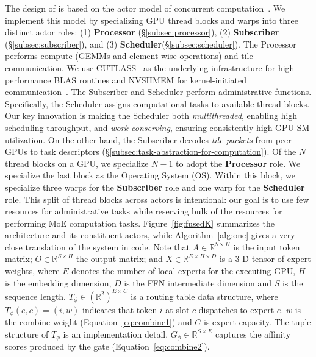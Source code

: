 The design of \sysname is based on the actor model of concurrent
computation~\cite{agha:85, 10.5555/1624775.1624804, Greif:75}.
We implement this model by specializing GPU thread blocks and warps into three distinct actor roles:
(1) \textbf{Processor} (\S\ref{subsec:processor}), (2) \textbf{Subscriber} (\S\ref{subsec:subscriber}),
and (3) \textbf{Scheduler}(\S\ref{subsec:scheduler}).
The Processor performs compute (GEMMs and element-wise operations) and tile communication.
We use CUTLASS~\cite{Thakkar_CUTLASS_2023} as the underlying infrastructure for high-performance
BLAS routines and NVSHMEM for kernel-initiated communication~\cite{nvshm}.
The Subscriber and Scheduler perform administrative functions.
Specifically, the Scheduler assigns computational tasks to available thread blocks.
Our key innovation is making the Scheduler both \emph{multithreaded},
enabling high scheduling throughput, and \emph{work-conserving}, ensuring consistently high GPU SM utilization.
On the other hand, the Subscriber decodes \emph{tile packets} from peer GPUs to task descriptors
(\S\ref{subsec:task-abstraction-for-computation}).
Of the $N$ thread blocks on a GPU, we specialize $N-1$ to adopt the \textbf{Processor} role.
We specialize the last block as the Operating System (OS).
Within this block, we specialize three warps for the \textbf{Subscriber} role and
one warp for the \textbf{Scheduler} role.
This split of thread blocks across actors is intentional: our goal is to use few resources for administrative
tasks while reserving bulk of the resources for performing MoE computation tasks.
Figure~\ref{fig:fusedK} summarizes the
\sysname architecture and its constituent actors, while Algorithm~\ref{alg:one} gives a very close translation of the
system in code.
Note that $A \in \mathbb{R}^{S \times H}$ is the input token matrix;
$O \in \mathbb{R}^{S \times H}$ the output matrix;
and $X \in \mathbb{R}^{E\times H \times D}$ is a 3-D tensor of expert weights,
where $E$ denotes the number of local experts for the executing GPU, $H$ is the embedding dimension,
$D$ is the FFN intermediate dimension and $S$ is the sequence length.
$T_{\phi} \in \left(\mathbb{R}^2\right)^{E \times C}$
is a routing table data structure, where $T_{\phi}\left( e, c\right) = (i, w)$ indicates that token $i$ at slot $c$
dispatches to expert $e$. $w$ is the combine weight (Equation~\ref{eq:combine1}) and $C$ is expert capacity.
The tuple structure of $T_{\phi}$ is an implementation detail. $G_{\phi} \in \mathbb{R}^{S \times E}$ captures
the affinity scores produced by the gate (Equation~\ref{eq:combine2}).

